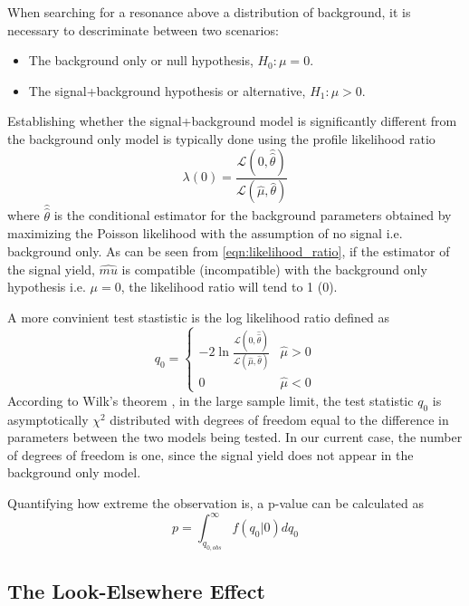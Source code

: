 When searching for a resonance above a distribution of background, it is 
necessary to descriminate between two scenarios:
\begin{itemize}
    \item The background only or null hypothesis, $H_{0}: \mu = 0$.
    \item The signal+background hypothesis or alternative, $H_{1}: \mu > 0$.
\end{itemize}
Establishing whether the signal+background model is significantly different 
from the background only model is typically done using the profile likelihood
ratio
\begin{equation}
    \lambda(0) = \frac{\mathcal{L}(0, \hat{\hat{\theta}})}{\mathcal{L}(\hat{\mu}, \hat{\theta})}
    \label{eqn:likelihood_ratio}
\end{equation}
where $\hat{\hat{\theta}}$ is the conditional estimator for the background 
parameters obtained by maximizing the Poisson likelihood with the assumption
of no signal i.e. background only.  As can be seen from \ref{eqn:likelihood_ratio}, 
if the estimator of the signal yield, $\hat{mu}$ is compatible (incompatible) with the background
only hypothesis i.e. $\mu = 0$, the likelihood ratio will tend to 1 (0).

A more convinient test stastistic is the log likelihood ratio defined as
\begin{equation}
    q_0 = \begin{cases}
            -2 \ln \frac{\mathcal{L}(0, \hat{\hat{\theta}})}{\mathcal{L}(\hat{\mu}, \hat{\theta})} 
            & \hat{\mu} > 0 \\
             0  & \hat{\mu} < 0
        \end{cases}
\end{equation}
According to Wilk's theorem \cite{Wilks:1938dza}, in the large sample limit, the test statistic
$q_0$ is asymptotically $\chi^2$ distributed with degrees of freedom equal to the
difference in parameters between the two models being tested.  In our current case, 
the number of degrees of freedom is one, since the signal yield does not appear in
the background only model.

Quantifying how extreme the observation is, a p-value can be calculated as
\begin{equation}
    p = \int_{q_{0,obs}}^{\infty} f(q_{0} | 0) dq_{0}
\end{equation} 

\subsection{The Look-Elsewhere Effect}

